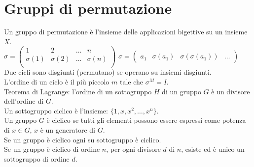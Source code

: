 \section{Gruppi di permutazione}
Un gruppo di permutazione è l'insieme delle applicazioni bigettive su un insieme $X$. \\
$\sigma = \begin{pmatrix}
    1 & 2 & \dots & n \\
    \sigma(1) & \sigma(2) & \dots & \sigma(n) \\ 
\end{pmatrix}$
$\sigma = \begin{pmatrix}
    a_1 & \sigma(a_1) & \sigma(\sigma(a_1)) & \ldots
\end{pmatrix}$ \\
Due cicli sono disgiunti (permutano) se operano su insiemi disgiunti. \\
L'ordine di un ciclo è il più piccolo $m$ tale che $\sigma^M = I$. \\
Teorema di Lagrange: l'ordine di un sottogruppo $H$ di un gruppo $G$ è un divisore dell'ordine di $G$. \\
Un sottogruppo ciclico è l'insieme: $\{1, x, x^2, \ldots, x^n\}$. \\
Un gruppo $G$ è ciclico se tutti gli elementi possono essere espressi come potenza di $x \in G$, $x$ è un generatore di $G$. \\
Se un gruppo è ciclico ogni su sottogruppo è ciclico. \\
Se un gruppo è ciclico di ordine $n$, per ogni divisore $d$ di $n$, esiste ed è unico un sottogruppo di ordine $d$. \\
